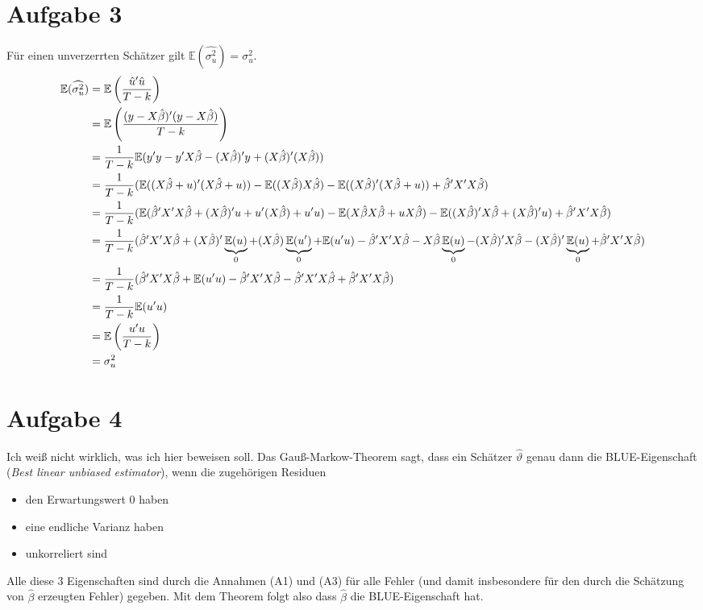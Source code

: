\documentclass{article}
\newcommand{\E}{\mathbb{E}}
\begin{document}
	\section*{Aufgabe 3}
	Für einen unverzerrten Schätzer gilt $\E(\widehat{\sigma_u^2}) = \sigma_u^2$.
	\begin{align}
		\E(\widehat{\sigma_u^2}) &= \E\left( \frac{\hat{u}'\hat{u}}{T-k}\right) \notag \\
		&= \E\left( \frac{(y-X\hat{\beta})'(y-X\hat{\beta})}{T-k}\right) \notag \\
		&= \frac{1}{T-k}\E(y'y - y'X\hat{\beta} - (X\hat{\beta})'y + (X\hat{\beta})'(X\hat{\beta})) \notag \\
		&= \frac{1}{T-k} (\E((X\hat{\beta}+u)'(X\hat{\beta}+u)) - \E((X\hat{\beta})X\hat{\beta}) - \E((X\hat{\beta})'(X\hat{\beta}+u)) + \hat{\beta}'X'X\hat{\beta}) \notag \\
		&= \frac{1}{T-k} (\E(\hat{\beta}'X'X\hat{\beta} + (X\hat{\beta})'u + u'(X\hat{\beta}) + u'u) - \E(X\hat{\beta}X\hat{\beta} + uX\hat{\beta}) - \E((X\hat{\beta})'X\hat{\beta} + (X\hat{\beta})'u) + \hat{\beta}'X'X\hat{\beta}) \notag \\
		&= \frac{1}{T-k} (\hat{\beta}'X'X\hat{\beta} + (X\hat{\beta})'\underbrace{\E(u)}_{0} + (X\hat{\beta})\underbrace{\E(u')}_{0} + \E(u'u) - \hat{\beta}'X'X\hat{\beta} - X\hat{\beta}\underbrace{\E(u)}_{0} - (X\hat{\beta})'X\hat{\beta} - (X\hat{\beta})'\underbrace{\E(u)}_{0} + \hat{\beta}'X'X\hat{\beta}) \notag \notag \\
		&= \frac{1}{T-k} (\hat{\beta}'X'X\hat{\beta} + \E(u'u) - \hat{\beta}'X'X\hat{\beta} - \hat{\beta}'X'X\hat{\beta} + \hat{\beta}'X'X\hat{\beta}) \notag \\
		&= \frac{1}{T-k} \E(u'u) \notag \\
		&= \E\left( \frac{u'u}{T-k}\right) \notag \\
		&= \sigma_u^2 \notag
	\end{align}

	\section*{Aufgabe 4}
	Ich weiß nicht wirklich, was ich hier beweisen soll. Das Gauß-Markow-Theorem sagt, dass ein Schätzer $\hat{\vartheta}$ genau dann die BLUE-Eigenschaft (\textit{Best linear unbiased estimator}), wenn die zugehörigen Residuen
	\begin{itemize}
		\item den Erwartungswert 0 haben
		\item eine endliche Varianz haben
		\item unkorreliert sind
	\end{itemize}
	Alle diese 3 Eigenschaften sind durch die Annahmen (A1) und (A3) für alle Fehler (und damit insbesondere für den durch die Schätzung von $\hat{\beta}$ erzeugten Fehler) gegeben. Mit dem Theorem folgt also dass
	$\hat{\beta}$ die BLUE-Eigenschaft hat.
\end{document}
